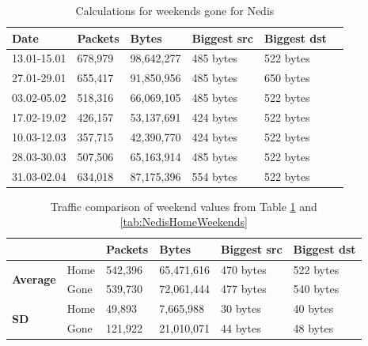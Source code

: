 \begin{table}[H]
    \centering
    \caption{Calculations for weekends gone for Nedis}
    \begin{tabular}{|l|l|l|l|l|l|}
        \hline
        \textbf{Date} & \textbf{Packets} & \textbf{Bytes} & \textbf{Biggest src} & \textbf{Biggest dst} \\ \hline
        13.01-15.01   & 678,979            & 98,642,277           & 485 bytes            & 522 bytes            \\ \hline
        27.01-29.01   & 655,417            & 91,850,956           & 485 bytes            & 650 bytes            \\ \hline
        03.02-05.02   & 518,316            & 66,069,105           & 485 bytes            & 522 bytes            \\ \hline
        17.02-19.02   & 426,157            & 53,137,691           & 424 bytes            & 522 bytes            \\ \hline
        10.03-12.03   & 357,715            & 42,390,770           & 424 bytes            & 522 bytes            \\ \hline
        28.03-30.03   & 507,506            & 65,163,914           & 485 bytes            & 522 bytes            \\ \hline
        31.03-02.04   & 634,018            & 87,175,396           & 554 bytes            & 522 bytes            \\ \hline
    \end{tabular}
    \label{tab:NedisGoneWeekends}
\end{table}

\begin{table}[H]
    \centering
    \caption{Traffic comparison of weekend values from Table \ref{tab:NedisGoneWeekends} and \ref{tab:NedisHomeWeekends}}
    \begin{tabular}{ll|l|l|l|l|}
        \cline{3-6}
        \textbf{}                                           & \textbf{} & \textbf{Packets} & \textbf{Bytes} & \textbf{Biggest src} & \textbf{Biggest dst} \\ \hline
        \multicolumn{1}{|l|}{\multirow{2}{*}{\textbf{Average}}} & Home      & 542,396          & 65,471,616     & 470 bytes            & 522 bytes            \\ \cline{2-6} 
        \multicolumn{1}{|l|}{}                              & Gone      & 539,730          & 72,061,444     & 477 bytes            & 540 bytes            \\ \hline
        \multicolumn{1}{|l|}{\multirow{2}{*}{\textbf{\gls{SD}}}}  & Home      & 49,893           & 7,665,988      & 30 bytes             & 40 bytes             \\ \cline{2-6} 
        \multicolumn{1}{|l|}{}                              & Gone      & 121,922          & 21,010,071     & 44 bytes             & 48 bytes             \\ \hline
    \end{tabular}
    \label{tab:NedisWeekends}
\end{table}


